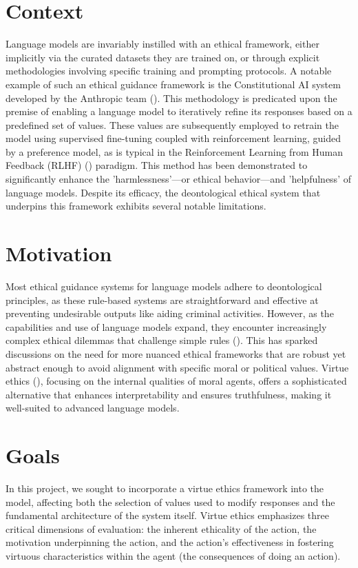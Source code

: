 \section{Context}

Language models are invariably instilled with an ethical framework, either implicitly via the curated datasets they are trained on, or through explicit methodologies involving specific training and prompting protocols. A notable example of such an ethical guidance framework is the Constitutional AI system developed by the Anthropic team (\cite{constitutionalai}). This methodology is predicated upon the premise of enabling a language model to iteratively refine its responses based on a predefined set of values. These values are subsequently employed to retrain the model using supervised fine-tuning coupled with reinforcement learning, guided by a preference model, as is typical in the Reinforcement Learning from Human Feedback (RLHF) (\cite{rlhf-hf}) paradigm. This method has been demonstrated to significantly enhance the 'harmlessness'—or ethical behavior—and 'helpfulness' of language models. Despite its efficacy, the deontological ethical system that underpins this framework exhibits several notable limitations.

\section{Motivation}
Most ethical guidance systems for language models adhere to deontological principles, as these rule-based systems are straightforward and effective at preventing undesirable outputs like aiding criminal activities. However, as the capabilities and use of language models expand, they encounter increasingly complex ethical dilemmas that challenge simple rules (\cite{edgecase-llm}). This has sparked discussions on the need for more nuanced ethical frameworks that are robust yet abstract enough to avoid alignment with specific moral or political values. Virtue ethics (\cite{sep-ethics-virtue}), focusing on the internal qualities of moral agents, offers a sophisticated alternative that enhances interpretability and ensures truthfulness, making it well-suited to advanced language models.

\section{Goals}
In this project, we sought to incorporate a virtue ethics framework into the model, affecting both the selection of values used to modify responses and the fundamental architecture of the system itself. Virtue ethics emphasizes three critical dimensions of evaluation: the inherent ethicality of the action, the motivation underpinning the action, and the action's effectiveness in fostering virtuous characteristics within the agent (the consequences of doing an action). 
